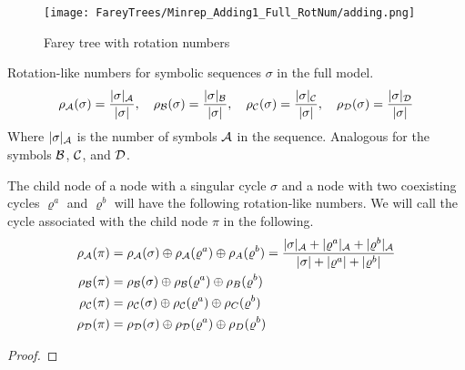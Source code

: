 \begin{figure}
    \centering
    \texttt{[image: FareyTrees/Minrep\_Adding1\_Full\_RotNum/adding.png]}
    \caption{Farey tree with rotation numbers}
\end{figure}

\begin{definition}
    Rotation-like numbers for symbolic sequences $\sigma$ in the full model.
    \begin{align*}
        \rho_{\mathcal{A}}(\sigma) = \dfrac{|\sigma|_{\mathcal{A}}}{|\sigma|}, \quad
        \rho_{\mathcal{B}}(\sigma) = \dfrac{|\sigma|_{\mathcal{B}}}{|\sigma|}, \quad
        \rho_{\mathcal{C}}(\sigma) = \dfrac{|\sigma|_{\mathcal{C}}}{|\sigma|}, \quad
        \rho_{\mathcal{D}}(\sigma) = \dfrac{|\sigma|_{\mathcal{D}}}{|\sigma|}
    \end{align*}
    Where $|\sigma|_{\mathcal{A}}$ is the number of symbols $\mathcal{A}$ in the sequence.
    Analogous for the symbols $\mathcal{B}$, $\mathcal{C}$, and $\mathcal{D}$.
\end{definition}

\begin{definition}
\end{definition}

\begin{theorem}
    The child node of a node with a singular cycle $\sigma$ and a node with two coexisting cycles $\varrho^a$ and $\varrho^b$ will have the following rotation-like numbers.
    We will call the cycle associated with the child node $\pi$ in the following.
    \begin{align*}
        \rho_{\mathcal{A}}(\pi) & =
        \rho_{\mathcal{A}}(\sigma) \oplus \rho_{\mathcal{A}}(\varrho^a) \oplus \rho_A(\varrho^b) =
        \dfrac{|\sigma|_{\mathcal{A}} + |\varrho^a|_{\mathcal{A}} + |\varrho^b|_{\mathcal{A}}}{|\sigma| + |\varrho^a| + |\varrho^b|} \\
        \rho_{\mathcal{B}}(\pi) & =
        \rho_{\mathcal{B}}(\sigma) \oplus \rho_{\mathcal{B}}(\varrho^a) \oplus \rho_B(\varrho^b)                          \\
        \rho_{\mathcal{C}}(\pi) & =
        \rho_{\mathcal{C}}(\sigma) \oplus \rho_{\mathcal{C}}(\varrho^a) \oplus \rho_C(\varrho^b)                          \\
        \rho_{\mathcal{D}}(\pi) & =
        \rho_{\mathcal{D}}(\sigma) \oplus \rho_{\mathcal{D}}(\varrho^a) \oplus \rho_D(\varrho^b)
    \end{align*}
\end{theorem}

\begin{proof}
\end{proof}

